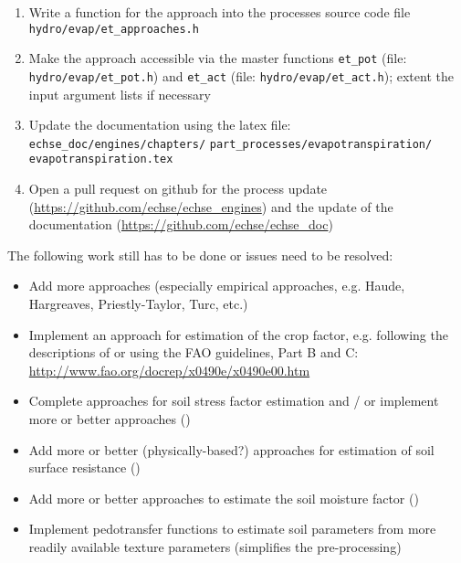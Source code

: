 \begin{enumerate}
\item Write a function for the approach into the processes source code file \verb!hydro/evap/et_approaches.h!
\item Make the approach accessible via the master functions \verb!et_pot! (file: \verb!hydro/evap/et_pot.h!) and \verb!et_act! (file: \verb!hydro/evap/et_act.h!); extent the input argument lists if necessary
\item Update the documentation using the latex file: \verb!echse_doc/engines/chapters/! \verb!part_processes/evapotranspiration/! \verb!evapotranspiration.tex!
\item Open a pull request on github for the process update (\url{https://github.com/echse/echse_engines}) and the update of the documentation (\url{https://github.com/echse/echse_doc})
\end{enumerate}

The following work still has to be done or issues need to be resolved:

\begin{itemize}
\item Add more approaches (especially empirical approaches, e.g. Haude, Hargreaves, Priestly-Taylor, Turc, etc.)
\item Implement an approach for estimation of the crop factor, e.g. following the descriptions of  or using the FAO guidelines, Part B and C: \url{http://www.fao.org/docrep/x0490e/x0490e00.htm}
\item Complete approaches for soil stress factor estimation and / or implement more or better approaches ()
\item Add more or better (physically-based?) approaches for estimation of soil surface resistance ()
\item Add more or better approaches to estimate the soil moisture factor ()
\item Implement pedotransfer functions to estimate soil parameters from more readily available texture parameters (simplifies the pre-processing)
\end{itemize}
